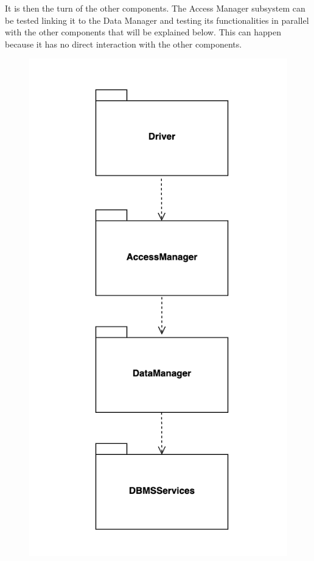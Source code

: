 \documentclass[]{article}
\begin{document}
\noindent
It is then the turn of the other components. The Access Manager subsystem can be tested linking it to the Data Manager and testing its functionalities in parallel with the other components that will be explained below. This can happen because it has no direct interaction with the other components.
				\begin{figure}[H]
					\centering
					\includegraphics[scale=0.7]{Testing/Testing2.png}
					\caption{}
					\label{fig:Testing}
				\end{figure}
\end{document}
